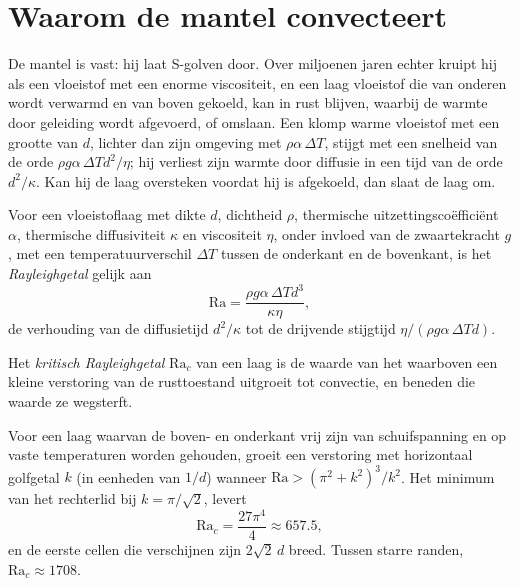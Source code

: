 \section{Waarom de mantel convecteert}

De mantel is vast: hij laat S-golven door. Over miljoenen jaren echter kruipt hij
als een vloeistof met een enorme viscositeit, en een laag vloeistof die van onderen
wordt verwarmd en van boven gekoeld, kan in rust blijven, waarbij de warmte door
geleiding wordt afgevoerd, of omslaan. Een klomp warme vloeistof met een grootte van $d$, lichter dan zijn
omgeving met $\rho\alpha\,\Delta T$, stijgt met een snelheid van de orde
$\rho g\alpha\,\Delta T d^2/\eta$; hij verliest zijn warmte door diffusie in een tijd van
de orde $d^2/\kappa$. Kan hij de laag oversteken voordat hij is afgekoeld, dan
slaat de laag om.

\begin{definition}[Rayleighgetal]\label{def:b3:mantle-convection:rayleigh}
Voor een vloeistoflaag met dikte $d$, dichtheid $\rho$, thermische uitzettingscoëfficiënt
$\alpha$, thermische diffusiviteit $\kappa$ en viscositeit $\eta$, onder
invloed van de zwaartekracht $g$, met een temperatuurverschil $\Delta T$ tussen de onderkant en de
bovenkant, is het \emph{Rayleighgetal} gelijk aan
\[
  \mathrm{Ra} = \frac{\rho g\alpha\,\Delta T d^3}{\kappa\eta},
\]
de verhouding van de diffusietijd $d^2/\kappa$ tot de drijvende stijgtijd
$\eta/(\rho g\alpha\,\Delta Td)$.
\end{definition}

\begin{definition}\label{def:b3:mantle-convection:critical}
Het \emph{kritisch Rayleighgetal}
$\mathrm{Ra}_c$ van een laag is de waarde van het  waarboven een
kleine verstoring van de rusttoestand uitgroeit tot convectie, en beneden die waarde
ze wegsterft.
\end{definition}

\begin{proposition}\label{prop:b3:mantle-convection:onset}
Voor een laag waarvan de boven- en onderkant vrij zijn van schuifspanning en op vaste
temperaturen worden gehouden, groeit een verstoring met horizontaal golfgetal $k$ (in eenheden van $1/d$)
wanneer $\mathrm{Ra} > (\pi^2 + k^2)^3/k^2$. Het minimum van het rechterlid
bij $k = \pi/\sqrt2$, levert
\[
  \mathrm{Ra}_c = \frac{27\pi^4}{4} \approx 657.5,
\]
en de eerste cellen die verschijnen zijn $2\sqrt2\,d$ breed. Tussen starre randen,
$\mathrm{Ra}_c \approx 1708$.
\end{proposition}

